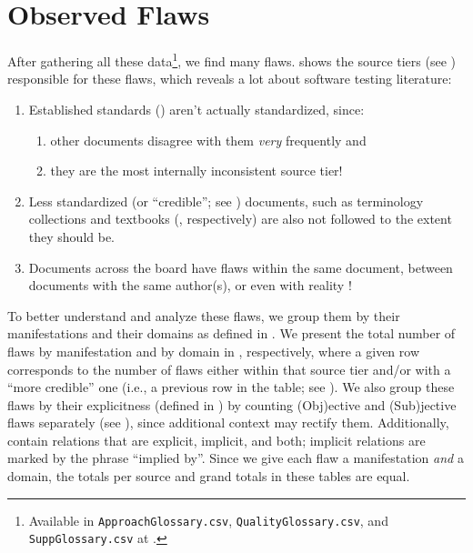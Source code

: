 \section{Observed Flaws}\label{flaws}


After gathering all these data\footnote{Available in \texttt{ApproachGlossary.csv},
    \texttt{QualityGlossary.csv}, and \texttt{SuppGlossary.csv} at .}, we find many
flaws.  shows the source tiers (see )
responsible for these flaws, which reveals a lot about software testing literature:
\begin{enumerate}
    \item Established standards () aren't actually standardized, since:
          \begin{enumerate}
              \item other documents disagree with them \emph{very} frequently and
              \item they are the most internally inconsistent source tier!
          \end{enumerate}
    \item Less standardized (or ``credible''; see ) documents,
          such as terminology collections and textbooks (,
          respectively) are also not followed to the extent they should be.
    \item Documents across the board have flaws within the same document,
          between documents with the same author(s), or even with reality%
          !
\end{enumerate}

\ifnotpaper
    \afterpage{}
\fi

To better understand and analyze these flaws, we group them by their
manifestations and their domains as defined in .
We present the total number of flaws by manifestation and by domain
in , respectively, where a given
row corresponds to the number of flaws either within that source tier and/or
with a ``more credible'' one (i.e., a previous row in the table; see
). We also group these flaws by their explicitness
(defined in ) by counting (Obj)ective and (Sub)jective flaws
separately (see ), since additional
context may rectify them. \ifnotpaper Additionally,
     contain relations that
    are explicit, implicit, and both; implicit relations are marked by the
    phrase ``implied by''. \fi
Since we give each flaw a manifestation \emph{and} a domain, the totals per
source and grand totals in these tables are equal.

